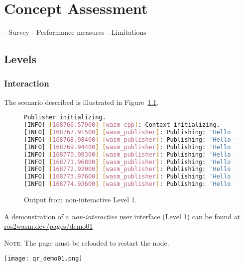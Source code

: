 \chapter{Concept Assessment}\label{cha:assessment}

- Survey
- Performance measures
- Limitations

\section{Levels}

    \subsection{Interaction}

        The scenario described is illustrated in Figure~\ref{fig:ui1}.

        \begin{figure}[htbp]
            \centering
            \begin{lstlisting}[language=Bash]
Publisher initializing.
[INFO] [168766.57900] [wasm_cpp]: Context initializing.
[INFO] [168767.91500] [wasm_publisher]: Publishing: 'Hello there! 0'
[INFO] [168768.98400] [wasm_publisher]: Publishing: 'Hello there! 1'
[INFO] [168769.94400] [wasm_publisher]: Publishing: 'Hello there! 2'
[INFO] [168770.90300] [wasm_publisher]: Publishing: 'Hello there! 3'
[INFO] [168771.96800] [wasm_publisher]: Publishing: 'Hello there! 4'
[INFO] [168772.92000] [wasm_publisher]: Publishing: 'Hello there! 5'
[INFO] [168773.97600] [wasm_publisher]: Publishing: 'Hello there! 6'
[INFO] [168774.93600] [wasm_publisher]: Publishing: 'Hello there! 7'
\end{lstlisting}
            \caption{Output from non-interactive Level 1.}\label{fig:ui1}
        \end{figure}

        \begin{tcolorbox}[title=Example 1]
            \begin{minipage}[t]{0.87\linewidth}
                \vspace*{0pt}
                A demonstration of a \textit{non-interactive} user interface (Level 1) can
                be found at \href{https://ros2wasm.dev/pages/demo01/index.html}{\textsf{ros2wasm.dev/pages/demo01}}

                \textsc{Note:} The page must be reloaded to restart the node.
            \end{minipage}\hfill%
            \begin{minipage}[t]{0.1\linewidth}
                \vspace*{0pt}
                \texttt{[image: qr\_demo01.png]}
            \end{minipage}
        \end{tcolorbox}


